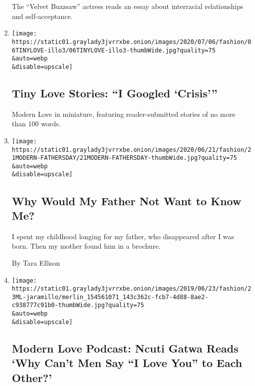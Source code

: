 \begin{enumerate}
  The ``Velvet Buzzsaw'' actress reads an essay about interracial
  relationships and self-acceptance.
\item
  \href{/2020/06/23/style/tiny-modern-love-stories-coronavirus-i-googled-crisis.html}{}

  \texttt{[image: https://static01.graylady3jvrrxbe.onion/images/2020/07/06/fashion/06TINYLOVE-illo3/06TINYLOVE-illo3-thumbWide.jpg?quality=75\\\&auto=webp\\\&disable=upscale]}

  \hypertarget{tiny-love-stories-i-googled-crisis}{%
  \subsection{Tiny Love Stories: ``I Googled
  `Crisis'''}\label{tiny-love-stories-i-googled-crisis}}

  Modern Love in miniature, featuring reader-submitted stories of no
  more than 100 words.
\item
  \href{/2020/06/19/style/modern-love-coronavirus-missing-father.html}{}

  \texttt{[image: https://static01.graylady3jvrrxbe.onion/images/2020/06/21/fashion/21MODERN-FATHERSDAY/21MODERN-FATHERSDAY-thumbWide.jpg?quality=75\\\&auto=webp\\\&disable=upscale]}

  \hypertarget{why-would-my-father-not-want-to-know-me}{%
  \subsection{Why Would My Father Not Want to Know
  Me?}\label{why-would-my-father-not-want-to-know-me}}

  I spent my childhood longing for my father, who disappeared after I
  was born. Then my mother found him in a brochure.

  By Tara Ellison
\item
  \href{/2020/06/17/style/modern-love-podcast-ncuti-gatwa.html}{}

  \texttt{[image: https://static01.graylady3jvrrxbe.onion/images/2019/06/23/fashion/23ML-jaramillo/merlin\_154561071\_143c362c-fcb7-4d88-8ae2-c938777c91b0-thumbWide.jpg?quality=75\\\&auto=webp\\\&disable=upscale]}

  \hypertarget{modern-love-podcast-ncuti-gatwa-reads-why-cant-men-say-i-love-you-to-each-other}{%
  \subsection{Modern Love Podcast: Ncuti Gatwa Reads `Why Can't Men Say
  ``I Love You'' to Each
  Other?'}\label{modern-love-podcast-ncuti-gatwa-reads-why-cant-men-say-i-love-you-to-each-other}}


\end{enumerate}
